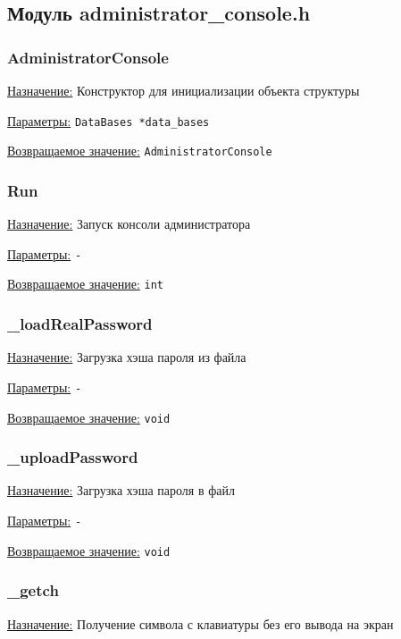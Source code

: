 \subsection{Модуль administrator\_console.h}


\subsubsection{AdministratorConsole}

\underline{Назначение:} Конструктор для инициализации объекта структуры

\underline{Параметры:} \verb|DataBases *data_bases|

\underline{Возвращаемое значение:} \verb|AdministratorConsole|


\subsubsection{Run}

\underline{Назначение:} Запуск консоли администратора

\underline{Параметры:} \verb|-|

\underline{Возвращаемое значение:} \verb|int|


\subsubsection{\_loadRealPassword}

\underline{Назначение:} Загрузка хэша пароля из файла

\underline{Параметры:} \verb|-|

\underline{Возвращаемое значение:} \verb|void|


\subsubsection{\_uploadPassword}

\underline{Назначение:} Загрузка хэша пароля в файл

\underline{Параметры:} \verb|-|

\underline{Возвращаемое значение:} \verb|void|


\subsubsection{\_getch}

\underline{Назначение:} 
Получение символа с клавиатуры без его вывода на экран

